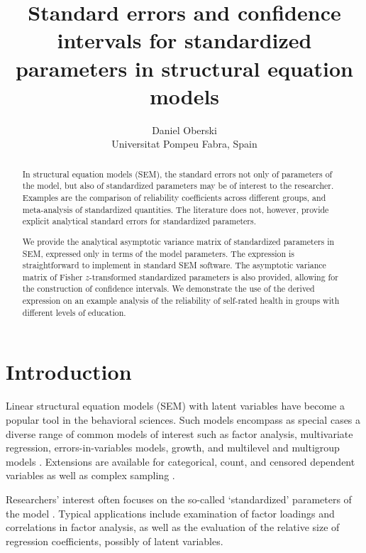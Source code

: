 \documentclass[a4paper,11pt]{article}
\title{Standard errors and confidence intervals for standardized parameters
 in structural equation models}
\author{Daniel Oberski\\Universitat Pompeu Fabra, Spain}
\newcommand{\0}{\boldsymbol{0}}
\begin{document}
\maketitle


\begin{abstract}\noindent
In structural equation models (SEM), the standard errors not only of parameters of the model, but
also of standardized parameters may be of interest to the researcher. 
Examples are the comparison of reliability coefficients across different groups, and meta-analysis of 
standardized quantities.
The literature does not, however, provide explicit analytical standard errors 
for standardized parameters. %

We provide the analytical asymptotic variance matrix of standardized parameters in SEM, 
expressed only in terms of the model parameters. The expression is straightforward to 
implement in standard SEM software. 
The asymptotic variance matrix of Fisher $z$-transformed standardized parameters is also provided, 
allowing for the construction of confidence intervals.
We demonstrate the use of the derived expression on an example analysis of the
reliability of self-rated health in groups with different levels of education.
\end{abstract}

\section{Introduction}\noindent
Linear structural equation models (SEM) with latent variables
have become a popular tool in the behavioral sciences. Such models encompass as special cases a diverse range of common models of interest such as factor
analysis, multivariate regression, errors-in-variables models, growth, and
multilevel and multigroup models \citep{bollen1989structural}. Extensions are available for categorical, count,
and censored dependent variables as well as complex sampling 
 \citep{muthen1995complex,muthen2002beyond}.

Researchers' interest often focuses on the so-called 
`standardized' parameters of the model \citep{bollen1989structural}. Typical applications include examination of factor loadings and correlations in factor analysis, as well as the evaluation of the relative size of regression coefficients, possibly of latent variables.
\end{document}
